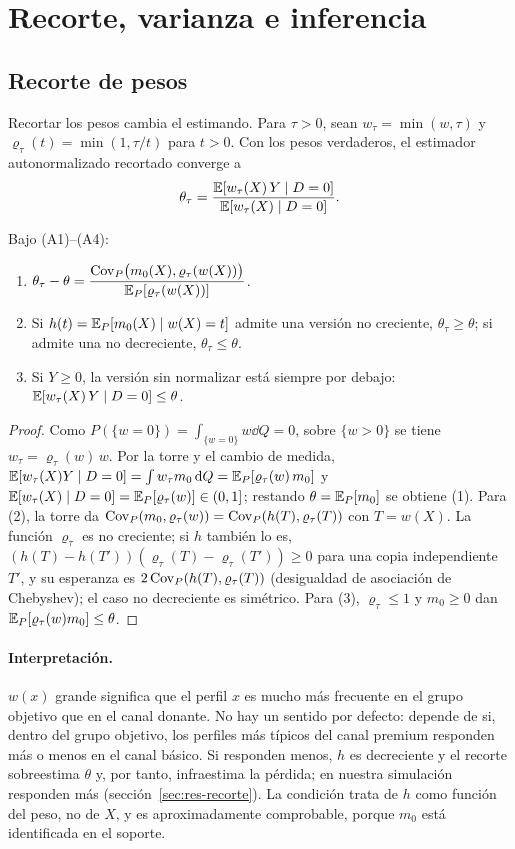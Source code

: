 \section{Recorte, varianza e inferencia}\label{sec:inferencia}

\subsection{Recorte de pesos}\label{sec:recorte}

Recortar los pesos cambia el estimando. Para $\tau>0$, sean $w_\tau=\min(w,\tau)$ y $\varrho_\tau(t)=\min(1,\tau/t)$ para $t>0$. Con los pesos verdaderos, el estimador autonormalizado recortado converge a
\[
\theta_\tau=\frac{\mathbb{E}[w_\tau(X)\,Y\mid D=0]}{\mathbb{E}[w_\tau(X)\mid D=0]}.
\]

\begin{proposicion}\label{prop:recorte}
Bajo (A1)--(A4):
\begin{enumerate}
  \item $\displaystyle\theta_\tau-\theta=\frac{\operatorname{Cov}_P\bigl(m_0(X),\varrho_\tau(w(X))\bigr)}{\mathbb{E}_P[\varrho_\tau(w(X))]}$.
  \item Si $h(t)=\mathbb{E}_P[m_0(X)\mid w(X)=t]$ admite una versión no creciente, $\theta_\tau\ge\theta$; si admite una no decreciente, $\theta_\tau\le\theta$.
  \item Si $Y\ge0$, la versión sin normalizar está siempre por debajo: $\mathbb{E}[w_\tau(X)\,Y\mid D=0]\le\theta$.
\end{enumerate}
\end{proposicion}
\begin{proof}
Como $P(\{w=0\})=\int_{\{w=0\}}w\dd Q=0$, sobre $\{w>0\}$ se tiene $w_\tau=\varrho_\tau(w)\,w$. Por la torre y el cambio de medida, $\mathbb{E}[w_\tau(X)Y\mid D=0]=\int w_\tau m_0\,\mathrm{d} Q=\mathbb{E}_P[\varrho_\tau(w)\,m_0]$ y $\mathbb{E}[w_\tau(X)\mid D=0]=\mathbb{E}_P[\varrho_\tau(w)]\in(0,1]$; restando $\theta=\mathbb{E}_P[m_0]$ se obtiene (1). Para (2), la torre da $\operatorname{Cov}_P(m_0,\varrho_\tau(w))=\operatorname{Cov}_P(h(T),\varrho_\tau(T))$ con $T=w(X)$. La función $\varrho_\tau$ es no creciente; si $h$ también lo es, $(h(T)-h(T'))(\varrho_\tau(T)-\varrho_\tau(T'))\ge0$ para una copia independiente $T'$, y su esperanza es $2\operatorname{Cov}_P(h(T),\varrho_\tau(T))$ (desigualdad de asociación de Chebyshev); el caso no decreciente es simétrico. Para (3), $\varrho_\tau\le1$ y $m_0\ge0$ dan $\mathbb{E}_P[\varrho_\tau(w)m_0]\le\theta$.
\end{proof}

\paragraph{Interpretación.} $w(x)$ grande significa que el perfil $x$ es mucho más frecuente en el grupo objetivo que en el canal donante. No hay un sentido por defecto: depende de si, dentro del grupo objetivo, los perfiles más típicos del canal premium responden más o menos en el canal básico. Si responden menos, $h$ es decreciente y el recorte sobreestima $\theta$ y, por tanto, infraestima la pérdida; en nuestra simulación responden más (sección~\ref{sec:res-recorte}). La condición trata de $h$ como función del peso, no de $X$, y es aproximadamente comprobable, porque $m_0$ está identificada en el soporte.

